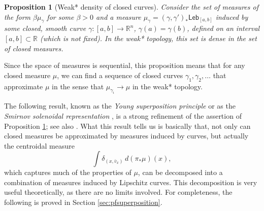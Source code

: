 \documentclass[11pt]{article}
\newtheorem{prop}[thm]{Proposition}
\theoremstyle{definition}
\theoremstyle{remark}
\newcommand{\R}{\mathbb{R}}
\newcommand{\lebesgue}{\mathsf{Leb}}
\begin{document}
\begin{prop}[Weak* density of closed curves]\label{prop:closedapproximation}
 Consider the set of measures 
 of the form $\beta\mu_\gamma$ for some $\beta>0$ and a measure $\mu_\gamma=(\gamma,\gamma')_*\lebesgue_{[a,b]}$ induced by some closed, smooth curve $\gamma\colon[a,b]\to\R^n$, $\gamma(a)=\gamma(b)$, defined on an interval $[a,b]\subset\R$ (which is not fixed). In the weak* topology, this set is dense in the set of closed measures.
\end{prop}


Since the space of measures is sequential, this proposition means that for any closed measure $\mu$, we can find a sequence of closed curves $\gamma_1,\gamma_2,\dots$ that approximate $\mu$ in the sense that $\mu_{\gamma_i}\to\mu$ in the weak* topology. 

The following result, known as the \emph{Young superposition principle} \cite{young1969,patrick} or as the \emph{Smirnov solenoidal representation} \cite{smirnov1993decomposition,bangert1999minimal}, is a strong refinement of the assertion of Proposition \ref{prop:closedapproximation}; see also \cite[Example 6]{rodolfo}. What this result tells us is basically that, not only can closed measures be approximated by measures induced by curves, but actually the centroidal measure 
\[\int \delta_{(x,\bar v_x)}\,d (\pi_*\mu)(x), \]
which captures much of the properties of $\mu$, can be decomposed into a combination of measures induced by Lipschitz curves. This decomposition is very useful theoretically, as there are no limits involved. For completeness, the following is proved in Section \ref{sec:pfsuperposition}.

%
\end{document}
